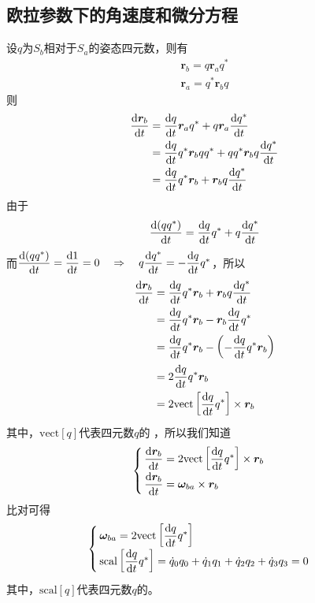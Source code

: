\subsection{欧拉参数下的角速度和微分方程}
设$q$为$S_b$相对于$S_a$的姿态四元数，则有
\begin{align*}
	\bm{r}_b = q \bm{r}_a q^* \\
	\bm{r}_a = q^* \bm{r}_b q
\end{align*}
则
\begin{align*}
	\dfrac{{\rm{d}} \bm{r}_b}{{\rm{d}} t} 
	&= \dfrac{{\rm{d}} q}{{\rm{d}} t} \bm{r}_a q^* + q \bm{r}_a \dfrac{{\rm{d}} q^*}{{\rm{d}} t} \\
	&= \dfrac{{\rm{d}} q}{{\rm{d}} t} q^* \bm{r}_b q q^* + q q^* \bm{r}_b q \dfrac{{\rm{d}} q^*}{{\rm{d}} t} \\
	&= \dfrac{{\rm{d}} q}{{\rm{d}} t} q^* \bm{r}_b + \bm{r}_b q \dfrac{{\rm{d}} q^*}{{\rm{d}} t}
\end{align*}
由于
\begin{equation*}
	\dfrac{{\rm{d}} (q q^*)}{{\rm{d}} t} = \dfrac{{\rm{d}} q}{{\rm{d}} t} q^* + q \dfrac{{\rm{d}} q^*}{{\rm{d}} t}
\end{equation*}
而$\dfrac{{\rm{d}} (q q^*)}{{\rm{d}} t} = \dfrac{{\rm{d}} 1}{{\rm{d}} t} = 0 \quad \Rightarrow \quad q \dfrac{{\rm{d}} q^*}{{\rm{d}} t} = - \dfrac{{\rm{d}} q}{{\rm{d}} t} q^*$，所以
\begin{align*}
	\dfrac{{\rm{d}} \bm{r}_b}{{\rm{d}} t} 
	&= \dfrac{{\rm{d}} q}{{\rm{d}} t} q^* \bm{r}_b + \bm{r}_b q \dfrac{{\rm{d}} q^*}{{\rm{d}} t} \\
	&= \dfrac{{\rm{d}} q}{{\rm{d}} t} q^* \bm{r}_b - \bm{r}_b \dfrac{{\rm{d}} q}{{\rm{d}} t} q^* \\
	&= \dfrac{{\rm{d}} q}{{\rm{d}} t} q^* \bm{r}_b - \left( -\dfrac{{\rm{d}} q}{{\rm{d}} t} q^* \bm{r}_b \right) \\
	&= 2 \dfrac{{\rm{d}} q}{{\rm{d}} t} q^* \bm{r}_b \\
	&= 2 \text{vect}\left[\dfrac{{\rm{d}} q}{{\rm{d}} t} q^*\right] \times \bm{r}_b
\end{align*}
其中，$\text{vect} [q]$代表四元数$q$的
，所以我们知道
\begin{equation}
	\begin{cases}
		\, \dfrac{{\rm{d}} \bm{r}_b}{{\rm{d}} t} = 2 \text{vect}\left[\dfrac{{\rm{d}} q}{{\rm{d}} t} q^*\right] \times \bm{r}_b \\[0.5em]
		\, \dfrac{{\rm{d}} \bm{r}_b}{{\rm{d}} t} = \bm{\omega}_{ba} \times \bm{r}_b
	\end{cases}
\end{equation}
比对可得
\begin{equation}
	\begin{cases}
		\, \bm{\omega}_{ba} = 2 \text{vect}\left[\dfrac{{\rm{d}} q}{{\rm{d}} t} q^*\right] \\[0.5em]
		\, \text{scal}\left[\dfrac{{\rm{d}} q}{{\rm{d}} t} q^*\right] = \dot{q}_0q_0 + \dot{q}_1 q_1 + \dot{q}_2 q_2 + \dot{q}_3 q_3 = 0
	\end{cases}
\end{equation}
其中，$\text{scal} [q]$代表四元数$q$的。

